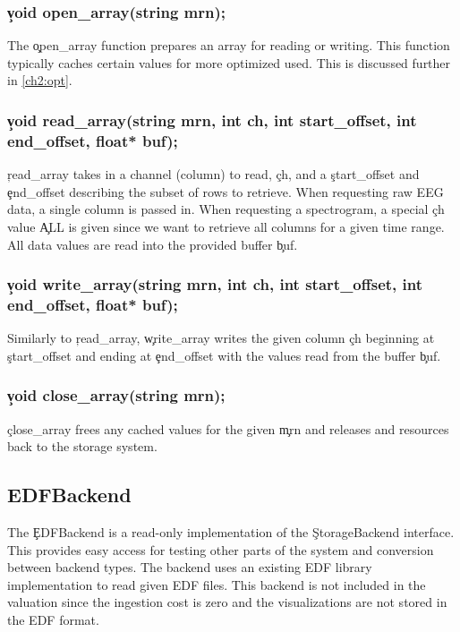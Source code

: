 \subsubsection{\c{void open\_array(string mrn);}}
The \c{open\_array} function prepares an array for reading or writing. This
function typically caches certain values for more optimized used. This is
discussed further in \ref{ch2:opt}.

\subsubsection{\c{void read\_array(string mrn, int ch, int start\_offset, int end\_offset, float* buf);}}
\c{read\_array} takes in a channel (column) to read, \c{ch}, and a
\c{start\_offset} and \c{end\_offset} describing the subset of rows to
retrieve.  When requesting raw EEG data, a single column is passed in. When
requesting a spectrogram, a special \c{ch} value \c{ALL} is given since we want
to retrieve all columns for a given time range. All data values are read into
the provided buffer \c{buf}.

\subsubsection{\c{void write\_array(string mrn, int ch, int start\_offset, int end\_offset, float* buf);}}
Similarly to \c{read\_array}, \c{write\_array} writes the given column \c{ch}
beginning at \c{start\_offset} and ending at \c{end\_offset} with the values
read from the buffer \c{buf}.

\subsubsection{\c{void close\_array(string mrn);}}
\c{close\_array} frees any cached values for the given \c{mrn} and releases
and resources back to the storage system.

\subsection{EDFBackend}

The \c{EDFBackend} is a read-only implementation of the \c{StorageBackend}
interface. This provides easy access for testing other parts of the system and
conversion between backend types. The backend uses an existing EDF library
implementation \cite{edflib} to read given EDF files. This backend is not
included in the valuation since the ingestion cost is zero and the
visualizations are not stored in the EDF format.


